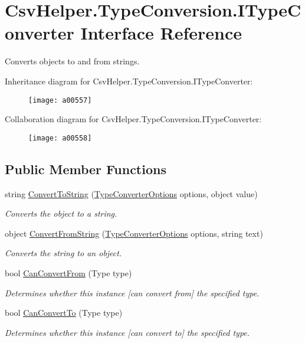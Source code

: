 \hypertarget{a00125}{\section{Csv\-Helper.\-Type\-Conversion.\-I\-Type\-Converter Interface Reference}
\label{a00125}
}


Converts objects to and from strings.  




Inheritance diagram for Csv\-Helper.\-Type\-Conversion.\-I\-Type\-Converter\-:
\nopagebreak
\begin{figure}[H]
\begin{center}
\leavevmode
\texttt{[image: a00557]}
\end{center}
\end{figure}


Collaboration diagram for Csv\-Helper.\-Type\-Conversion.\-I\-Type\-Converter\-:
\nopagebreak
\begin{figure}[H]
\begin{center}
\leavevmode
\texttt{[image: a00558]}
\end{center}
\end{figure}
\subsection*{Public Member Functions}
\begin{DoxyCompactItemize}
\item 
string \hyperlink{a00125_a90c465c63dbcf913f38aa878f35e77c7}{Convert\-To\-String} (\hyperlink{a00180}{Type\-Converter\-Options} options, object value)
\begin{DoxyCompactList}\small\item\em Converts the object to a string. \end{DoxyCompactList}\item 
object \hyperlink{a00125_ab598e04c22e5a7890b6d21011492283e}{Convert\-From\-String} (\hyperlink{a00180}{Type\-Converter\-Options} options, string text)
\begin{DoxyCompactList}\small\item\em Converts the string to an object. \end{DoxyCompactList}\item 
bool \hyperlink{a00125_ae1ad863656f4fa96bd846a41344c9349}{Can\-Convert\-From} (Type type)
\begin{DoxyCompactList}\small\item\em Determines whether this instance \mbox{[}can convert from\mbox{]} the specified type. \end{DoxyCompactList}\item 
bool \hyperlink{a00125_a168b03dad37fcb6882101c93deac8111}{Can\-Convert\-To} (Type type)
\begin{DoxyCompactList}\small\item\em Determines whether this instance \mbox{[}can convert to\mbox{]} the specified type. \end{DoxyCompactList}\end{DoxyCompactItemize}


